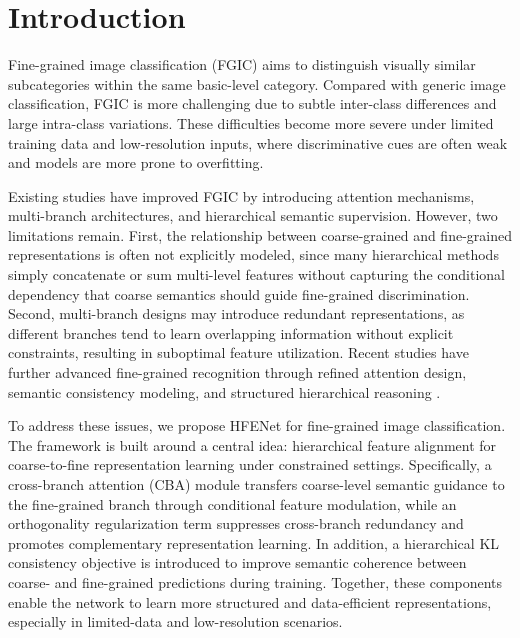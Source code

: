 \documentclass[pdflatex,iicol,sn-mathphys-num]{sn-jnl}
\theoremstyle{thmstyleone}%
\theoremstyle{thmstyletwo}%
\theoremstyle{thmstylethree}%
\begin{document}

\maketitle

\section{Introduction}
\label{sec:introduction}

Fine-grained image classification (FGIC) aims to distinguish visually similar subcategories within the same basic-level category. Compared with generic image classification, FGIC is more challenging due to subtle inter-class differences and large intra-class variations. These difficulties become more severe under limited training data and low-resolution inputs, where discriminative cues are often weak and models are more prone to overfitting.

Existing studies have improved FGIC by introducing attention mechanisms, multi-branch architectures, and hierarchical semantic supervision. However, two limitations remain. First, the relationship between coarse-grained and fine-grained representations is often not explicitly modeled, since many hierarchical methods simply concatenate or sum multi-level features without capturing the conditional dependency that coarse semantics should guide fine-grained discrimination. Second, multi-branch designs may introduce redundant representations, as different branches tend to learn overlapping information without explicit constraints, resulting in suboptimal feature utilization. Recent studies have further advanced fine-grained recognition through refined attention design, semantic consistency modeling, and structured hierarchical reasoning \cite{wang2025crasmra,wang2025cfgvc,gao2025chbc}.

To address these issues, we propose HFENet for fine-grained image classification. The framework is built around a central idea: hierarchical feature alignment for coarse-to-fine representation learning under constrained settings. Specifically, a cross-branch attention (CBA) module transfers coarse-level semantic guidance to the fine-grained branch through conditional feature modulation, while an orthogonality regularization term suppresses cross-branch redundancy and promotes complementary representation learning. In addition, a hierarchical KL consistency objective is introduced to improve semantic coherence between coarse- and fine-grained predictions during training. Together, these components enable the network to learn more structured and data-efficient representations, especially in limited-data and low-resolution scenarios.
\end{document}
